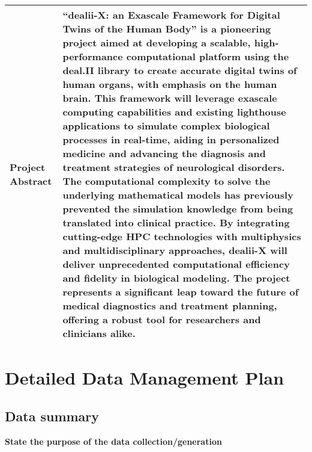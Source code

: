 \documentclass[a4paper,12pt]{article}
\begin{document}
\begin{center}
\begin{tabular}{|>{\bfseries\color{EUblue}}L|>{\arraybackslash}m{10cm}|}
Project Abstract & ``dealii-X: an Exascale Framework for Digital Twins of the Human Body'' is a pioneering project aimed at developing a scalable, high-performance computational platform using the deal.II library to create accurate digital twins of human organs, with emphasis on the human brain. This framework will leverage exascale computing capabilities and existing lighthouse applications to simulate complex biological processes in real-time, aiding in personalized medicine and advancing the diagnosis and treatment strategies of neurological disorders. The computational complexity to solve the underlying mathematical models has previously prevented the simulation knowledge from being translated into clinical practice. By integrating cutting-edge HPC technologies with multiphysics and multidisciplinary approaches, dealii-X will deliver unprecedented computational efficiency and fidelity in biological modeling. The project represents a significant leap toward the future of medical diagnostics and treatment planning, offering a robust tool for researchers and clinicians alike. \\ \hline
\end{tabular}
\end{center}

\section{\textcolor{EUblue}{Detailed Data Management Plan}}

\subsection{Data summary}

\textbf{State the purpose of the data collection/generation}
\end{document}
